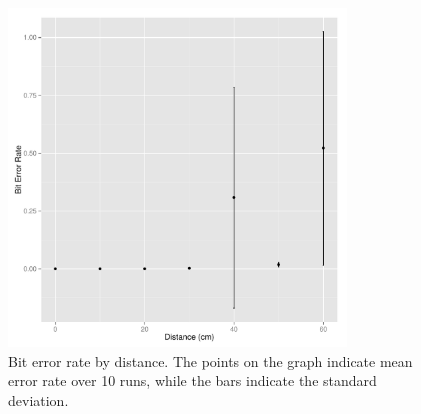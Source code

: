 \documentclass{article}
\begin{document}
\begin{figure}[h!]
  \label{fig:distance_results}
  \centering
  \includegraphics[width=0.8\textwidth]{figure.pdf}
  \caption{Bit error rate by distance. The points on the graph
    indicate mean error rate over 10 runs, while the bars indicate the
  standard deviation.}

\end{figure}
\end{document}
